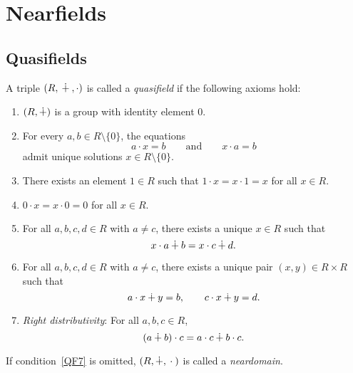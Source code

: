 \chapter{Nearfields}
\label{ch:nearfields}

\section{Quasifields}

\begin{defn}\label{defn:quasifield}
    A triple $(R,{}\dotplus{},\cdot)$ is called a \textsl{quasifield} if the following axioms hold:
    \begin{enumerate}[label=qf$_{\arabic*}$.,
        ref={\scshape qf$_{\arabic*}$},
        font=\scshape]
        \item\label{QF1} $(R,\dotplus)$ is a group with identity element $0$.
        \item\label{QF2} For every $a,b\in R\setminus\{0\}$, the equations
            \[
                a\cdot x = b
                \qquad\text{and}\qquad
                x\cdot a = b
            \]
            admit unique solutions $x\in R\setminus\{0\}$.
        \item\label{QF3} There exists an element $1\in R$ such that $1\cdot x = x\cdot 1 = x$ for all $x\in R$.
        \item\label{QF4} $0\cdot x = x\cdot 0 = 0$ for all $x\in R$.
        \item\label{QF5} For all $a,b,c,d\in R$ with $a\ne c$, there exists a unique $x\in R$ such that
            \[
                x\cdot a \dotplus b = x\cdot c \dotplus d.
            \]
        \item\label{QF6} For all $a,b,c,d\in R$ with $a\ne c$, there exists a unique pair $(x,y)\in R\times R$ such that
            \[
                a\cdot x \dotplus y = b,
                \qquad
                c\cdot x \dotplus y = d.
            \]
        \item\label{QF7} \textsl{Right distributivity}: For all $a,b,c\in R$,
            \[
                (a\dotplus b)\cdot c = a\cdot c \dotplus b\cdot c.
            \]
    \end{enumerate}
    If condition~\textsc{\ref{QF7}} is omitted, $(R,\dotplus,{}\cdot{})$ is called a \textsl{neardomain}.
\end{defn}

